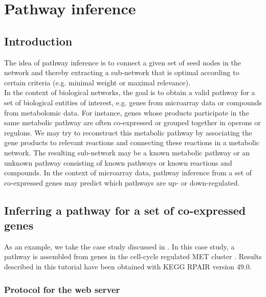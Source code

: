 \chapter{Pathway inference}

\section{Introduction}
The idea of pathway inference is to connect a given set of seed nodes
in the network and thereby extracting a sub-network that is optimal
according to certain criteria (e.g. minimal weight or maximal relevance).\\
In the context of biological networks, the goal is to obtain a valid pathway for a set
of biological entities of interest, e.g. genes from microarray data or compounds from metabolomic data.
For instance, genes whose products participate in the same metabolic pathway are often co-expressed or grouped
together in operons or regulons. We may try to reconstruct this metabolic pathway by associating
the gene products to relevant reactions and connecting these reactions in a metabolic network.
The resulting sub-network may be a known metabolic pathway or an unknown pathway consisting of known
pathways or known reactions and compounds. In the context of microarray data, pathway inference from a
set of co-expressed genes may predict which pathways are up- or down-regulated.\\

\section{Inferring a pathway for a set of co-expressed genes}

As an example, we take the case study discussed in \cite{vanHelden01}.
In this case study, a pathway is assembled from genes in the cell-cycle regulated MET cluster \cite{Spellman98}.
Results described in this tutorial have been obtained with KEGG RPAIR version 49.0.

\subsection{Protocol for the web server}

